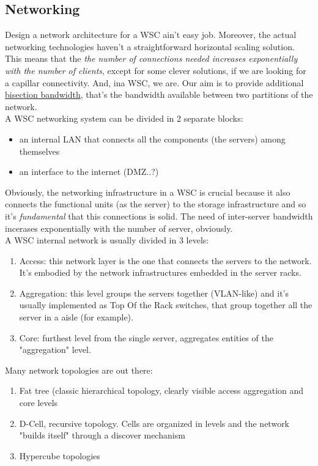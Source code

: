 \documentclass{article}
\begin{document}
			\subsection{Networking}
				Design a network architecture for a WSC ain't easy job. Moreover, the actual networking technologies haven't a straightforward horizontal scaling solution. This means that the \emph{the number of connections needed increases exponentially with the number of clients}, except for some clever solutions, if we are looking for a capillar connectivity. And, ina WSC, we are. Our aim is to provide additional \underline{bisection bandwidth}, that's the bandwidth available between two partitions of the network.\\ 
				A WSC networking system can be divided in 2 separate blocks:
				\begin{itemize}
					\item an internal LAN that connects all the components (the servers) among themselves
					\item an interface to the internet (DMZ..?)
				\end{itemize}
				
				Obviously, the networking infrastructure in a WSC is crucial because it also connects the functional units (as the server) to the storage infrastructure and so it's \emph{fundamental} that this connections is solid. The need of inter-server bandwidth incerases exponentially with the number of server, obviously.\\
				A WSC internal network is usually divided in 3 levels:
				\begin{enumerate}
					\item Access: this network layer is the one that connects the servers to the network. It's embodied by the network infrastructures embedded in the server racks.
					\item Aggregation: this level groups the servers together (VLAN-like) and it's usually implemented as Top Of the Rack switches, that group together all the server in a aisle (for example).
					\item Core: furthest level from the single server, aggregates entities of the "aggregation" level.
				\end{enumerate}
				Many network topologies are out there:
				\begin{enumerate}
					\item Fat tree (classic hierarchical topology, clearly visible access aggregation and core levels
					\item D-Cell, recursive topology. Cells are organized in levels and the network "builds itself" through a discover mechanism
					\item Hypercube topologies
				\end{enumerate}
				
\end{document}

